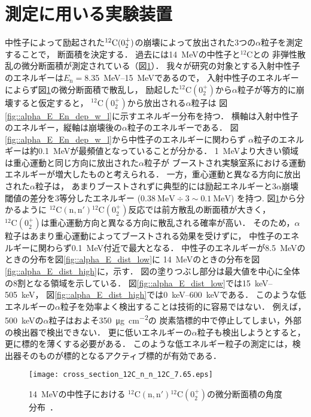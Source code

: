 \documentclass[../master]{subfiles}
\begin{document}
\section{測定に用いる実験装置}
\label{seq::detector_using_experiment}
中性子によって励起された${}^{12}{\rm C} (0_2^+)$の崩壊によって放出された3つの$\alpha$粒子を測定することで，
断面積を決定する．
過去には\SI{14}{\mega\electronvolt}の中性子と${}^{12}\mathrm{C}$との
非弾性散乱の微分断面積が測定されている（図\ref{fig::sig_angle_dist}）．
我々が研究の対象とする入射中性子のエネルギーは$E_{\mathrm{n}} = $\SIrange{8.35}{15}{\mega\electronvolt}であるので，
入射中性子のエネルギーによらず図\ref{fig::sig_angle_dist}の微分断面積で散乱し，
励起した${}^{12}\mathrm{C}(0_2^+)$から$\alpha$粒子が等方的に崩壊すると仮定すると，
${}^{12}\mathrm{C} (0_2^+)$から放出される$\alpha$粒子は
図\ref{fig::alpha_E_En_dep_w_l}に示すエネルギー分布を持つ．
横軸は入射中性子のエネルギー，縦軸は崩壊後の$\alpha$粒子のエネルギーである．
図\ref{fig::alpha_E_En_dep_w_l}から中性子のエネルギーに関わらず
$\alpha$粒子のエネルギーは約\SI{0.1}{\mega\electronvolt}が最頻値となっていることが分かる．
\SI{1}{\mega\electronvolt}より大きい領域は重心運動と同じ方向に放出された$\alpha$粒子が
ブーストされ実験室系における運動エネルギーが増大したものと考えられる．
一方，重心運動と異なる方向に放出された$\alpha$粒子は，
あまりブーストされずに典型的には励起エネルギーと3$\alpha$崩壊閾値の差分を3等分したエネルギー
($\SI{0.38}{\mega\electronvolt}\div 3 \sim \SI{0.1}{\mega\electronvolt}$) を持つ.
図\ref{fig::sig_angle_dist}から分かるように
${}^{12}\mathrm{C}(\mathrm{n},\mathrm{n}'){}^{12}\mathrm{C}(0_2^+)$反応では前方散乱の断面積が大きく，
${}^{12}\mathrm{C} (0_2^+)$は重心運動方向と異なる方向に散乱される確率が高い．
そのため，$\alpha$粒子はあまり重心運動によってブーストされる効果を受けずに，
中性子のエネルギーに関わらず\SI{0.1}{\mega\electronvolt}付近で最大となる．
中性子のエネルギーが\SI{8.5}{\mega\electronvolt}のときの分布を図\ref{fig::alpha_E_dist_low}に
\SI{14}{\mega\electronvolt}のときの分布を図\ref{fig::alpha_E_dist_high}に，示す．
図の塗りつぶし部分は最大値を中心に全体の8割となる領域を示している．
図\ref{fig::alpha_E_dist_low}では\SIrange{15}{505}{\kilo\electronvolt}，
図\ref{fig::alpha_E_dist_high}では\SIrange{0}{600}{\kilo\electronvolt}である．
このような低エネルギーの$\alpha$粒子を効率よく検出することは技術的に容易ではない．
例えば，\SI{500}{\kilo\electronvolt}の$\alpha$粒子はおよそ\SI{350}{\micro\gram\per\square\centi\metre}の
炭素箔標的中で停止してしまい，外部の検出器で検出できない．
更に低いエネルギーの$\alpha$粒子も検出しようとすると，更に標的を薄くする必要がある．
このような低エネルギー粒子の測定には，検出器そのものが標的となるアクティブ標的が有効である．
\begin{figure}
  \centering
  \texttt{[image: cross\_section\_12C\_n\_n\_12C\_7.65.eps]}
  \caption{\SI{14}{\mega\electronvolt}の中性子における
    ${}^{12}\mathrm{C}(\mathrm{n},\mathrm{n}'){}^{12}\mathrm{C} (0_2^+)$の微分断面積の角度分布~\cite{kondoetal}．}
  \label{fig::sig_angle_dist}
\end{figure}
\end{document}
